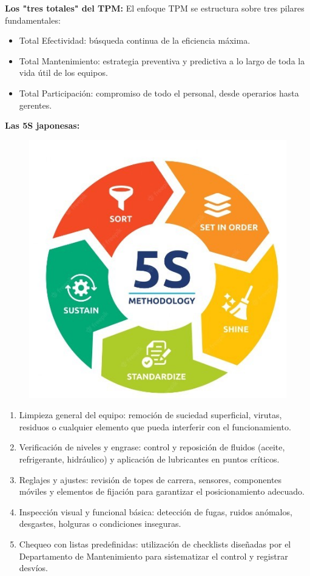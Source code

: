 \documentclass[a4paper,oneside,11pt]{article}
\begin{document}
\begin{enumerate}
    \textbf{Los "tres totales" del TPM:} El enfoque TPM se estructura sobre tres pilares fundamentales:
    
    \begin{itemize}
        \item Total Efectividad: búsqueda continua de la eficiencia máxima.
        \item Total Mantenimiento: estrategia preventiva y predictiva a lo largo de toda la vida útil de los equipos.
        \item Total Participación: compromiso de todo el personal, desde operarios hasta gerentes.
    \end{itemize}

    \textbf{Las 5S japonesas:}

    \begin{figure} [ht!]
        \centering
        \includegraphics[width=0.5\linewidth]{5s.png}
    \end{figure}

    \begin{enumerate}
        \item Limpieza general del equipo: remoción de suciedad superficial, virutas, residuos o cualquier elemento que pueda interferir con el funcionamiento.
        \item Verificación de niveles y engrase: control y reposición de fluidos (aceite, refrigerante, hidráulico) y aplicación de lubricantes en puntos críticos.
        \item Reglajes y ajustes: revisión de topes de carrera, sensores, componentes móviles y elementos de fijación para garantizar el posicionamiento adecuado.
        \item Inspección visual y funcional básica: detección de fugas, ruidos anómalos, desgastes, holguras o condiciones inseguras.
        \item Chequeo con listas predefinidas: utilización de checklists diseñadas por el Departamento de Mantenimiento para sistematizar el control y registrar desvíos.
    \end{enumerate}



\end{enumerate}
\end{document}
